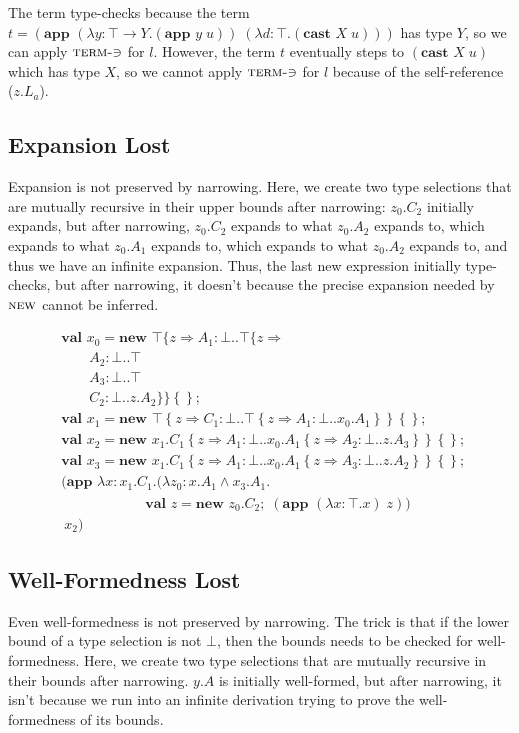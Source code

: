 \documentclass[9pt]{sigplanconf}
\newcommand{\gap}{\quad\quad}
\newcommand{\tfun}{\rightarrow}
\newcommand{\tand}{\wedge}
\newcommand{\refine}[2]{\left\{#1 \Rightarrow #2 \right\}}
\newcommand{\mlrefine}[2]{\{#1 \Rightarrow #2 \}}
\newcommand{\ldefs}[1]{\left\{#1\right\}}
\newcommand{\abs}[3]{\lambda #1\!:\!#2.#3}
\newcommand{\new}[3]{\textbf{val }#1 = \textbf{new }#2 ;\; #3}
\newcommand{\mlnew}[3]{\textbf{val }#1 = \textbf{new }#2 ;\;\\&#3}
\newcommand{\Ldecl}[3]{#1 : #2..#3}%
\newcommand{\Top}{\top}%
\newcommand{\Bot}{\bot}%
\newcommand{\app}[2]{(\textbf{app }#1\;#2)}
\newcommand{\mlapp}[2]{(\textbf{app }#1\;\\&#2)}
\newcommand{\cast}[2]{(\textbf{cast }#1\;#2)}
\begin{document}
The term type-checks because the term $t=\app {(\abs y {\Top \tfun Y}
  {\app y u})} {(\abs d \Top {\cast X u})}$ has type
$Y$, so we can apply $\textsc{term-$\ni$}$ for $l$. However, the term
$t$ eventually steps to ${\cast X u}$ which has type $X$,
so we cannot apply $\textsc{term-$\ni$}$ for $l$ because of the
self-reference ($z.L_a$).

\subsection{Expansion Lost}\label{narrowing_exp}

Expansion is not preserved by narrowing. Here, we create two type
selections that are mutually recursive in their upper bounds after
narrowing: $z_0.C_2$ initially expands, but after narrowing, $z_0.C_2$
expands to what $z_0.A_2$ expands to, which expands to what $z_0.A_1$
expands to, which expands to what $z_0.A_2$ expands to, and thus we
have an infinite expansion. Thus, the last new expression initially
type-checks, but after narrowing, it doesn't because the precise
expansion needed by $\textsc{new}$ cannot be inferred.

\begin{align*}
&\mlnew {x_0} {\Top \mlrefine z { \Ldecl {A_1} \Bot {\Top \mlrefine z {\\
&\gap\Ldecl {A_2} \Bot \Top\\
&\gap\Ldecl {A_3} \Bot \Top\\
&\gap\Ldecl {C_2} \Bot {z.A_2}}}}\ldefs{}}{
\mlnew {x_1} {\Top \refine z {\Ldecl {C_1} \Bot {\Top \refine z {\Ldecl {A_1} \Bot {x_0.A_1}}}}\ldefs{}}}{
\mlnew {x_2} {{x_1.C_1} \refine z {\Ldecl {A_1} \Bot {{x_0.A_1} \refine z {\Ldecl {A_2} \Bot {z.A_3}}}}\ldefs{}}}{
\mlnew {x_3} {{x_1.C_1} \refine z {\Ldecl {A_1} \Bot {{x_0.A_1} \refine z {\Ldecl {A_3} \Bot {z.A_2}}}}\ldefs{}}}{
\mlapp {\abs x {x_1.C_1} {(\abs {z_0} {x.A_1 \tand x_3.A_1} {\\&\gap\gap\gap\new z {z_0.C_2} {\app {(\abs x \Top x)} z}})}} {\ x_2}}
\end{align*}

\subsection{Well-Formedness Lost}\label{narrowing_wf}

Even well-formedness is not preserved by narrowing. The trick is that
if the lower bound of a type selection is not $\Bot$, then the
bounds needs to be checked for well-formedness. Here, we create two
type selections that are mutually recursive in their bounds
after narrowing. $y.A$ is initially well-formed, but after narrowing,
it isn't because we run into an infinite derivation trying to prove
the well-formedness of its bounds.
\end{document}
